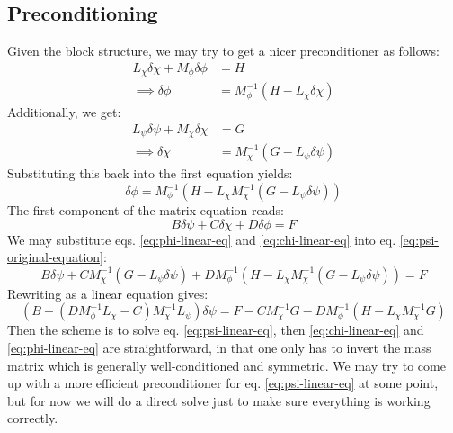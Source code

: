 \documentclass[reqno]{article}
\begin{document}
\subsection{Preconditioning}
Given the block structure, we may try to get a nicer preconditioner as follows:
\begin{equation} \label{eq:phi-linear-eq}
    \begin{split}
        L_\chi \delta \chi + M_\phi \delta \phi &= H \\
        \implies \delta \phi &= M_\phi^{-1} \left( H - L_\chi \delta \chi \right)
    \end{split}
\end{equation}
Additionally, we get:
\begin{equation} \label{eq:chi-linear-eq}
    \begin{split}
        L_\psi \delta \psi + M_\chi \delta \chi &= G \\
        \implies \delta \chi &= M_\chi^{-1} \left( G - L_\psi \delta \psi \right)
    \end{split}
\end{equation}
Substituting this back into the first equation yields:
\begin{equation}
    \delta \phi
    =
    M_\phi^{-1} \left( H - L_\chi M_\chi^{-1} \left(G - L_\psi \delta \psi \right) \right)
\end{equation}
The first component of the matrix equation reads:
\begin{equation} \label{eq:psi-original-equation}
    B \delta \psi
    + C \delta \chi
    + D \delta \phi
    =
    F
\end{equation}
We may substitute eqs. \eqref{eq:phi-linear-eq} and \eqref{eq:chi-linear-eq} into eq. \eqref{eq:psi-original-equation}:
\begin{equation}
    B \delta \psi 
    + C M_\chi^{-1} \left(G - L_\psi \delta \psi \right)
    + D M_\phi^{-1} \left(H - L_\chi M_\chi^{-1} \left(G - L_\psi \delta \psi \right) \right)
    =
    F
\end{equation}
Rewriting as a linear equation gives:
\begin{equation} \label{eq:psi-linear-eq}
    \left(B + \left( D M_\phi^{-1} L_\chi - C \right) M_\chi^{-1} L_\psi \right) \delta \psi
    =
    F - C M_\chi^{-1} G - D M_\phi^{-1} \left( H - L_\chi M_\chi^{-1} G \right)
\end{equation}
Then the scheme is to solve eq. \eqref{eq:psi-linear-eq}, then \eqref{eq:chi-linear-eq} and \eqref{eq:phi-linear-eq} are straightforward, in that one only has to invert the mass matrix which is generally well-conditioned and symmetric.
We may try to come up with a more efficient preconditioner for eq. \eqref{eq:psi-linear-eq} at some point, but for now we will do a direct solve just to make sure everything is working correctly.
\end{document}
